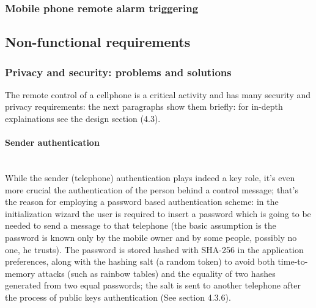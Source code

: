 \documentclass[a4paper,12pt]{article}
\begin{document}
\subsubsection{Mobile phone remote alarm triggering}
\subsection{Non-functional requirements}
\subsubsection{Privacy and security: problems and solutions}
\small{The remote control of a cellphone is a critical activity and has many security and privacy requirements: the next paragraphs show them briefly: for in-depth explainations see the design section (4.3).}
\vspace{10pt}
\paragraph{Sender authentication} \hspace{0pt} \\
\small{While the sender (telephone) authentication plays indeed a key role, it's even more crucial the authentication of the person behind a control message; that's the reason for employing a password based authentication scheme: in the initialization wizard the user is required to insert a password which is going to be needed to send a message to that telephone (the basic assumption is the password is known only by the mobile owner and by some people, possibly no one, he trusts). The password is stored hashed with SHA-256 in the application preferences, along with the hashing salt (a random token) to avoid both time-to-memory attacks (such as rainbow tables) and the equality of two hashes generated from two equal passwords; the salt is sent to another telephone after the process of public keys authentication (See section 4.3.6).}
\end{document}
